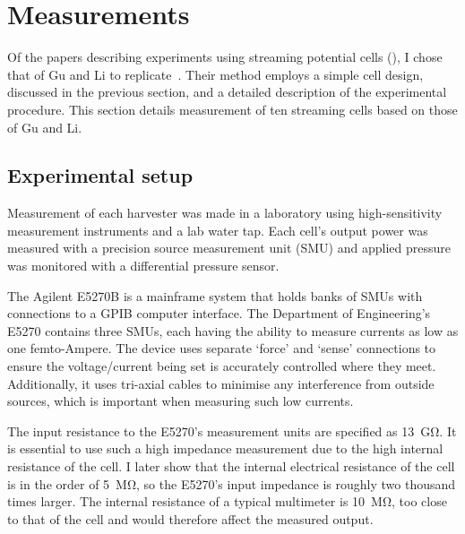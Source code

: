 \section{Measurements}
  \label{sect:part1_energyHarvesting_measuringStreamingCells}


  Of the papers describing experiments using streaming potential cells (\cite{Gu2000,Mala1997,Scales1992,VanderHeyden2006}), I chose that of Gu and Li to replicate~\cite{Gu2000}.
  Their method employs a simple cell design, discussed in the previous section, and a detailed description of the experimental procedure.
  This section details measurement of ten streaming cells based on those of Gu and Li.


  \subsection{Experimental setup}
    \label{sub:part1_energyHarvesting_measuringStreamingCells_experimentalSetup}


    Measurement of each harvester was made in a laboratory using high-sensitivity measurement instruments and a lab water tap.
    Each cell's output power was measured with a precision source measurement unit (SMU) and applied pressure was monitored with a differential pressure sensor.

    The Agilent E5270B is a mainframe system that holds banks of SMUs with connections to a GPIB computer interface.
    The Department of Engineering's E5270 contains three SMUs, each having the ability to measure currents as low as one femto-Ampere.
    The device uses separate `force' and `sense' connections to ensure the voltage/current being set is accurately controlled where they meet.
    Additionally, it uses tri-axial cables to minimise any interference from outside sources, which is important when measuring such low currents.

    The input resistance to the E5270's measurement units are specified as \SI{13}{\giga\ohm}.
    It is essential to use such a high impedance measurement due to the high internal resistance of the cell.
    I later show that the internal electrical resistance of the cell is in the order of \SI{5}{\mega\ohm}, so the E5270's input impedance is roughly two thousand times larger.
    The internal resistance of a typical multimeter is \SI{10}{\mega\ohm}, too close to that of the cell and would therefore affect the measured output.

